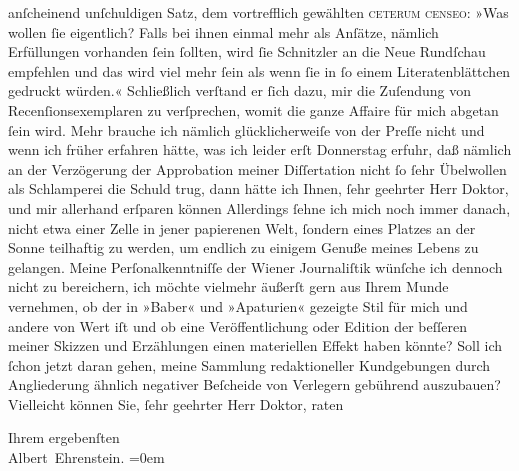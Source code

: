                anſcheinend unſchuldigen Satz, dem vortrefflich gewählten \textsc{ceterum censeo}: »Was wollen ſie eigentlich? Falls bei ihnen einmal mehr als
               Anſätze, nämlich Erfüllungen vorhanden ſein ſollten, wird ſie Schnitzler an die Neue Rundſchau empfehlen und das wird viel mehr
               ſein als wenn ſie in ſo einem Literatenblättchen gedruckt würden.« Schließlich
               verſtand er ſich dazu, mir die Zuſendung von Recenſionsexemplaren zu verſprechen,
               womit die ganze Affaire für mich abgetan ſein wird. Mehr brauche ich nämlich
               glücklicherweiſe von der Preſſe nicht und wenn
               ich früher erfahren hätte, was ich leider erſt Donnerstag erfuhr, daß
               nämlich an der Verzögerung der Approbation {\pb}meiner Diſſertation nicht ſo
               ſehr Übelwollen als Schlamperei die Schuld trug, dann hätte ich Ihnen, ſehr geehrter
               Herr Doktor, und mir allerhand erſparen können{\dotsfour} Allerdings
               ſehne ich mich noch immer danach, nicht etwa einer Zelle in jener papierenen Welt,
               ſondern eines Platzes an der Sonne teilhaftig zu werden, um endlich zu einigem Genuße
               meines Lebens zu gelangen. Meine Perſonalkenntniſſe der Wiener Journaliſtik wünſche ich dennoch nicht zu bereichern, ich möchte
               vielmehr äußerſt gern aus Ihrem Munde vernehmen, ob der in »Baber« und »Apaturien«
               gezeigte Stil für mich und andere von Wert iſt und ob eine Veröffentlichung oder
               Edition der beſſeren meiner Skizzen und Erzählungen einen materiellen Effekt haben
               könnte? Soll ich ſchon jetzt daran gehen, meine Sammlung redaktioneller Kundgebungen
               durch Angliederung ähnlich negativer Beſcheide von Verlegern gebührend auszubauen?
               Vielleicht können Sie, ſehr geehrter Herr Doktor, raten\pend
           
\pstart
           Ihrem ergebenſten{\\[\baselineskip]}\spacefill\mbox{Albert Ehrenstein.}\pend
           \leftskip=0em{}\endnumbering{}  
      